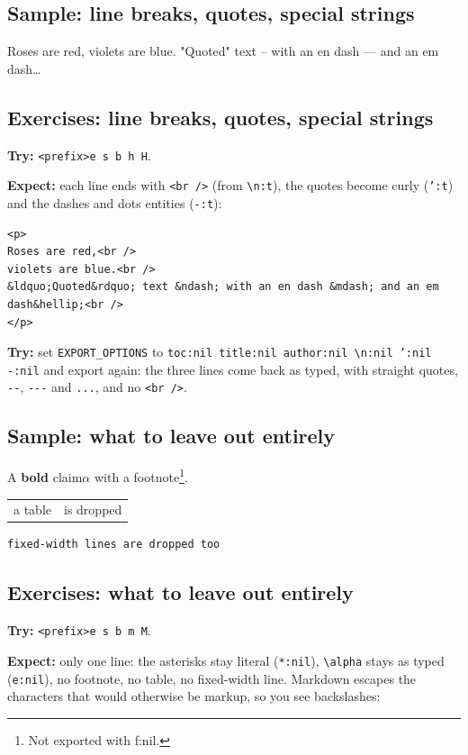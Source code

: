 \subsection{Sample: line breaks, quotes, special strings}
\label{sec:org6d62026}
Roses are red,
violets are blue.
"Quoted" text -- with an en dash --- and an em dash\ldots{}
\subsection{Exercises: line breaks, quotes, special strings}
\label{sec:org0f736aa}
\textbf{Try:} \texttt{<prefix>e s b h H}.

\textbf{Expect:} each line ends with \texttt{<br />} (from \texttt{\textbackslash{}n:t}), the quotes become
curly (\texttt{':t}) and the dashes and dots entities (\texttt{-:t}):

\begin{verbatim}
<p>
Roses are red,<br />
violets are blue.<br />
&ldquo;Quoted&rdquo; text &ndash; with an en dash &mdash; and an em dash&hellip;<br />
</p>
\end{verbatim}

\textbf{Try:} set \texttt{EXPORT\_OPTIONS} to \texttt{toc:nil title:nil author:nil \textbackslash{}n:nil ':nil
-:nil} and export again: the three lines come back as typed, with
straight quotes, \texttt{-{}-{}}, \texttt{-{}-{}-} and \texttt{...}, and no \texttt{<br />}.
\subsection{Sample: what to leave out entirely}
\label{sec:orgfd0c27f}
A \textbf{bold} claim\(\alpha\) with a footnote\footnote{Not exported with f:nil.}.

\begin{center}
\begin{tabular}{ll}
a table & is dropped\\
\end{tabular}
\end{center}

\begin{verbatim}
fixed-width lines are dropped too
\end{verbatim}
\subsection{Exercises: what to leave out entirely}
\label{sec:orgd22997b}
\textbf{Try:} \texttt{<prefix>e s b m M}.

\textbf{Expect:} only one line: the asterisks stay literal (\texttt{*:nil}), \texttt{\textbackslash{}alpha}
stays as typed (\texttt{e:nil}), no footnote, no table, no fixed-width line.
Markdown escapes the characters that would otherwise be markup, so you see
backslashes:

